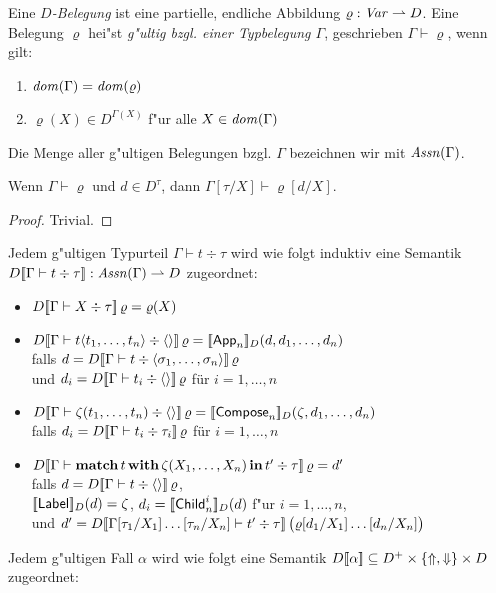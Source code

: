 \documentclass[%
  12pt,%
  a4paper,%
]{article}
\newcommand{\match}[3]{\textbf{match}\,{#1}\,\textbf{with}\,{#2}\,\textbf{in}\,{#3}}
\newcommand{\Tj}[3]{{#1}\vdash{#2}\div{#3}}
\begin{document}
Eine \emph{$D$-Belegung} ist eine partielle, endliche Abbildung $\varrho: \mathit{Var} \rightharpoonup D$. Eine Belegung
$\varrho$ hei"st \emph{g"ultig bzgl. einer Typbelegung $\Gamma$}, geschrieben $\Gamma \vdash \varrho$,
wenn gilt:
\begin{enumerate}
\item $\mathit{dom}(\Gamma) = \mathit{dom}(\varrho)$
\item $\varrho(X) \in D^{\Gamma(X)}$ f"ur alle $X \in \mathit{dom}(\Gamma)$
\end{enumerate}
Die Menge aller g"ultigen Belegungen bzgl. $\Gamma$ bezeichnen wir mit $\mathit{Assn}(\Gamma)$.
\begin{lemma}
  Wenn $\Gamma \vdash \varrho$ und $d \in D^\tau$, dann $\Gamma[\tau/X] \vdash \varrho[d/X]$.
\end{lemma}
\begin{proof}
  Trivial.
\end{proof}
Jedem g"ultigen Typurteil $\Tj{\Gamma}{t}{\tau}$ wird wie folgt induktiv
eine Semantik $D\sem{\Tj{\Gamma}{t}{\tau}}: \Assn(\Gamma) \pto D$ zugeordnet:
\begin{itemize}
\item $D\sem{\Tj{\Gamma}{X}{\tau}}\,\varrho = \varrho(X)$
\item $D\sem{\Tj{\Gamma}{t \langle t_1,\ldots,t_n \rangle}{\langle \rangle}}\,\varrho
  = \sem{\App_n}_D(d, d_1, \ldots, d_n)$ \\
  falls $d = D\sem{\Tj{\Gamma}{t}{\langle\sigma_1,\ldots,\sigma_n\rangle}}\,\varrho$ \\
  und $d_i = D\sem{\Tj{\Gamma}{t_i}{\langle \rangle}}\,\varrho$ f\"ur $i=1,\ldots,n$
\item $D\sem{\Tj{\Gamma}{\zeta(t_1,\ldots,t_n)}{\langle \rangle}}\,\varrho
  = \sem{\Compose_n}_D(\zeta,d_1,\ldots,d_n)$ \\
  falls $d_i = D\sem{\Tj{\Gamma}{t_i}{\tau_i}}\,\varrho$ f\"ur $i=1,\ldots,n$
\item $D\sem{\Tj{\Gamma}{\match{t}{\zeta(X_1,\ldots,X_n)}{t'}}{\tau}}\,\varrho
  = d'$ \\
  falls $d = D\sem{\Tj{\Gamma}{t}{\langle \rangle}}\,\varrho$, \\
  $[\![\mathsf{Label}]\!]_D(d) = \zeta$, $d_i = [\![\mathsf{Child}_n^i]\!]_D(d)$ f"ur $i=1,\ldots,n$, \\
  und $d' = D\sem{\Tj{\Gamma[\tau_1/X_1]\ldots[\tau_n/X_n]}{t'}{\tau}}\,\bigl(\varrho[d_1/X_1]\ldots[d_n/X_n]\bigr)$
\end{itemize}
Jedem g"ultigen Fall $\alpha$ wird wie folgt eine Semantik
$D[\![\alpha]\!] \subseteq D^+ \times \{\Uparrow,\Downarrow\} \times D$ zugeordnet:
\end{document}
